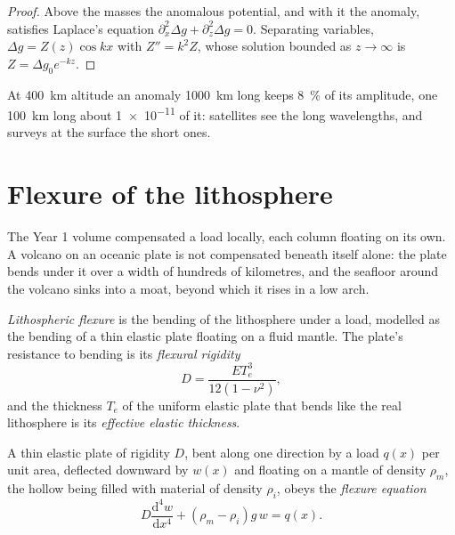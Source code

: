 \begin{proof}
Above the masses the anomalous potential, and with it the anomaly, satisfies
Laplace's equation $\partial_x^2\Delta g + \partial_z^2\Delta g = 0$. Separating
variables, $\Delta g = Z(z)\cos kx$ with $Z'' = k^2Z$, whose solution bounded as
$z \to \infty$ is $Z = \Delta g_0e^{-kz}$.
\end{proof}

At \qty{400}{km} altitude an anomaly \qty{1000}{km} long keeps \qty{8}{\percent}
of its amplitude, one \qty{100}{km} long about \num{1e-11} of it:
satellites see the long wavelengths, and surveys at the surface the short ones.

\section{Flexure of the lithosphere}

The Year 1 volume compensated a load locally, each column floating on its own.
A volcano on an oceanic plate is not compensated beneath itself alone: the
plate bends under it over a width of hundreds of kilometres, and the seafloor
around the volcano sinks into a moat, beyond which it rises in a low arch.

\begin{definition}\label{def:b3:gravity-geodesy:flexure}
\emph{Lithospheric flexure} is the bending of the
lithosphere under a load, modelled as the bending of a thin elastic plate
floating on a fluid mantle. The plate's resistance to bending is its
\emph{flexural rigidity}
\[
  D = \frac{ET_e^3}{12(1 - \nu^2)},
\]
and the thickness $T_e$ of the uniform elastic plate that bends like the real
lithosphere is its \emph{effective elastic thickness}.
\end{definition}

\begin{theorem}\label{thm:b3:gravity-geodesy:plate}
A thin elastic plate of rigidity $D$, bent along one direction by a load $q(x)$
per unit area, deflected downward by $w(x)$ and floating on a mantle of density
$\rho_m$, the hollow being filled with material of density $\rho_i$, obeys the
\emph{flexure equation}
\[
  D\frac{\mathrm d^4w}{\mathrm dx^4} + (\rho_m - \rho_i)g\,w = q(x) .
\]
\end{theorem}

